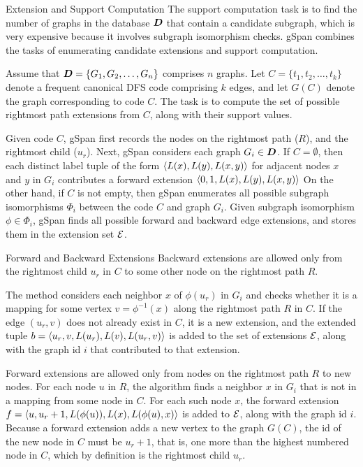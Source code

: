 \begin{frame}{Extension and Support Computation}
The support computation task is
to f\/{i}nd the number of graphs in the
database ${\boldsymbol D}$ that contain a candidate subgraph, which is very
expensive because it involves subgraph isomorphism checks.
gSpan combines the tasks of enumerating candidate extensions and support
computation.

\medskip
Assume that ${\boldsymbol D} = \{G_1, G_2, \ldots, G_n\}$ comprises $n$
graphs.  Let $C=\{t_1,t_2,\ldots,t_k\}$ denote a frequent
canonical DFS code comprising $k$ edges, and let $G(C)$ denote the
graph corresponding to code $C$.  The task is to compute the set
of possible rightmost path extensions from $C$, along with their
support values.

\medskip
Given code $C$, gSpan f\/{i}rst records the nodes on the rightmost path
($R$), and the rightmost child ($u_r$).  Next, gSpan considers each
graph $G_i \in {\boldsymbol D}$. If $C=\emptyset$, then each distinct label tuple of
the form $\langle L(x), L(y), L(x,y) \rangle$ for adjacent nodes $x$ and $y$ in
$G_i$ contributes a forward extension $\langle 0,1,L(x),L(y),L(x,y) \rangle$
On
the other hand, if $C$ is not empty, then gSpan enumerates all possible
subgraph isomorphisms $\Phi_i$ between the code $C$ and graph $G_i$. 
Given
subgraph
isomorphism $\phi \in \Phi_i$, gSpan f\/{i}nds all possible forward and
backward edge extensions, and stores them in the extension set ${\mathcal E}$.
\end{frame}

\begin{frame}{Forward and Backward Extensions}
  \small
Backward extensions are
allowed only from the rightmost
child $u_r$ in $C$ to some other node on the rightmost path $R$.

\medskip The method considers each neighbor $x$ of $\phi(u_r)$ in $G_i$
and checks whether it is a mapping for some vertex $v = \phi^{-1}(x)$
along the rightmost path $R$ in $C$. If the edge $(u_r,v)$ does not
already exist in $C$, it is a new extension, and the extended tuple $b =
\langle u_r, v, L(u_r), L(v), L(u_r,v) \rangle$ is added to the set of extensions
${\mathcal E}$, along with the graph id $i$ that contributed to that extension.

\bigskip Forward extensions are allowed only from nodes on the rightmost
path $R$ to new nodes.  For each node $u$ in $R$, the algorithm
f\/{i}nds a neighbor $x$ in $G_i$ that is not in a mapping from some
node in $C$. For each such node $x$, the forward extension $f=\langle u,
u_r+1, L(\phi(u)), L(x), L(\phi(u),x) \rangle$ is added to ${\mathcal E}$, along with
the graph id $i$.  Because a forward extension adds a new vertex to the
graph $G(C)$, the id of the new node in $C$ must be $u_r+1$, that is,
one more than the highest numbered node in $C$, which by def\/{i}nition
is the rightmost child $u_r$.

\end{frame}


